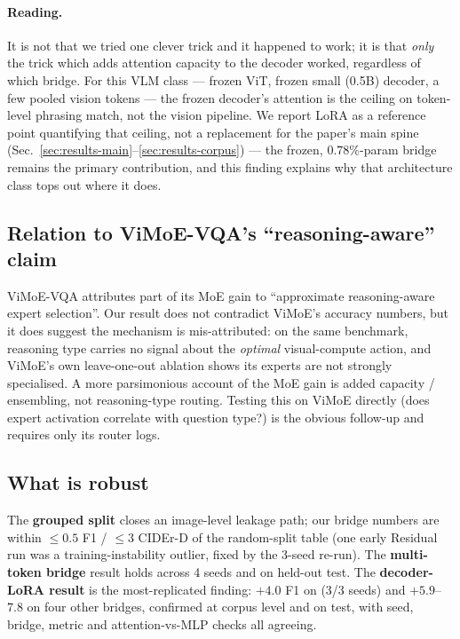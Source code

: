 \paragraph{Reading.}
It is not that we tried one clever trick and it happened to work; it is that
\emph{only} the trick which adds attention capacity to the decoder worked,
regardless of which bridge. For this VLM class --- frozen ViT, frozen small
(0.5B) decoder, a few pooled vision tokens --- the frozen decoder's attention is
the ceiling on token-level phrasing match, not the vision pipeline. We report
LoRA as a reference point quantifying that ceiling, not a replacement for the
paper's main spine
(Sec.~\ref{sec:results-main}--\ref{sec:results-corpus}) --- the frozen,
$0.78\%$-param bridge remains the primary contribution, and this finding explains
why that architecture class tops out where it does.

\subsection{Relation to ViMoE-VQA's ``reasoning-aware'' claim}

ViMoE-VQA attributes part of its MoE gain to ``approximate reasoning-aware expert
selection''. Our result does not contradict ViMoE's accuracy numbers, but it does
suggest the mechanism is mis-attributed: on the same benchmark, reasoning type
carries no signal about the \emph{optimal} visual-compute action, and ViMoE's own
leave-one-out ablation shows its experts are not strongly specialised. A more
parsimonious account of the MoE gain is added capacity / ensembling, not
reasoning-type routing. Testing this on ViMoE directly (does expert activation
correlate with question type?) is the obvious follow-up and requires only its
router logs.

\subsection{What is robust}

The \textbf{grouped split} closes an image-level leakage path; our bridge numbers
are within $\le 0.5$ F1 / $\le 3$ CIDEr-D of the random-split table (one early
Residual run was a training-instability outlier, fixed by the 3-seed re-run). The
\textbf{multi-token bridge} result holds across 4 seeds and on held-out test. The
\textbf{decoder-LoRA result} is the most-replicated finding: $+4.0$ F1 on
\multitoken{} (3/3 seeds) and $+5.9$--$7.8$ on four other bridges, confirmed at
corpus level and on test, with seed, bridge, metric and attention-vs-MLP checks
all agreeing.

